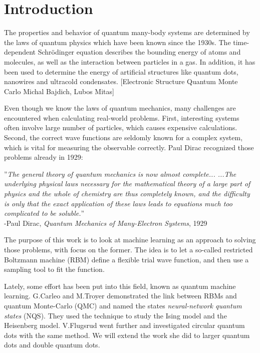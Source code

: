 \chapter{Introduction}
The properties and behavior of quantum many-body systems are determined by the laws of quantum physics which have been known since the 1930s. The time-dependent Schrödinger equation describes the bounding energy of atoms and molecules, as well as the interaction between particles in a gas. In addition, it has been used to determine the energy of artificial structures like quantum dots, nanowires and ultracold condensates. [Electronic Structure Quantum Monte Carlo Michal Bajdich, Lubos Mitas] 

Even though we know the laws of quantum mechanics, many challenges are encountered when calculating real-world problems. First, interesting systems often involve large number of particles, which causes expensive calculations. Second, the correct wave functions are seldomly known for a complex system, which is vital for measuring the observable correctly. Paul Dirac recognized those problems already in 1929: \bigskip


''\textit{The general theory of quantum mechanics is now almost complete... ...The underlying physical laws necessary for the mathematical theory of a large part of physics and the whole of chemistry are thus completely known, and the difficulty is only that the exact application of these laws leads to equations much too complicated to be soluble.}''\\ 
-Paul Dirac, \textit{Quantum Mechanics of Many-Electron Systems}, 1929 \cite{dirac_paul_adrien_maurice_quantum_1929} \bigskip

The purpose of this work is to look at machine learning as an approach to solving those problems, with focus on the former. The idea is to let a so-called restricted Boltzmann machine (RBM) define a flexible trial wave function, and then use a sampling tool to fit the function.

Lately, some effort has been put into this field, known as quantum machine learning. G.Carleo and M.Troyer demonstrated the link between RBMs and quantum Monte-Carlo (QMC) and named the states \textit{neural-network quantum states} (NQS). They used the technique to study the Ising model and the Heisenberg model. \cite{carleo_solving_2017} V.Flugsrud went further and investigated circular quantum dots with the same method.\cite{flugsrud_vilde_moe_solving_nodate} We will extend the work she did to larger quantum dots and double quantum dots.

